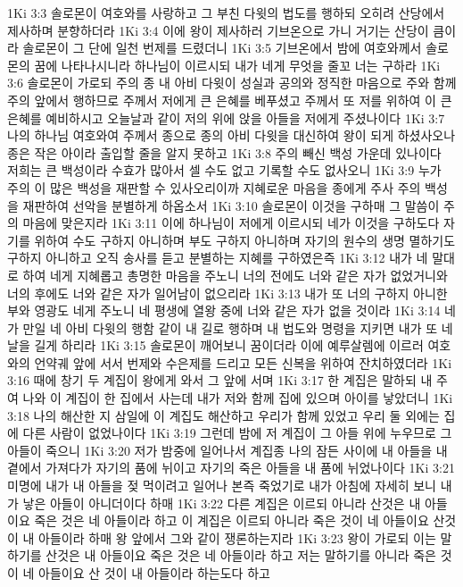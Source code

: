1Ki 3:3  솔로몬이 여호와를 사랑하고 그 부친 다윗의 법도를 행하되 오히려 산당에서 제사하며 분향하더라
1Ki 3:4  이에 왕이 제사하러 기브온으로 가니 거기는 산당이 큼이라 솔로몬이 그 단에 일천 번제를 드렸더니
1Ki 3:5  기브온에서 밤에 여호와께서 솔로몬의 꿈에 나타나시니라 하나님이 이르시되 내가 네게 무엇을 줄꼬 너는 구하라
1Ki 3:6  솔로몬이 가로되 주의 종 내 아비 다윗이 성실과 공의와 정직한 마음으로 주와 함께 주의 앞에서 행하므로 주께서 저에게 큰 은혜를 베푸셨고 주께서 또 저를 위하여 이 큰 은혜를 예비하시고 오늘날과 같이 저의 위에 앉을 아들을 저에게 주셨나이다
1Ki 3:7  나의 하나님 여호와여 주께서 종으로 종의 아비 다윗을 대신하여 왕이 되게 하셨사오나 종은 작은 아이라 출입할 줄을 알지 못하고
1Ki 3:8  주의 빼신 백성 가운데 있나이다 저희는 큰 백성이라 수효가 많아서 셀 수도 없고 기록할 수도 없사오니
1Ki 3:9  누가 주의 이 많은 백성을 재판할 수 있사오리이까 지혜로운 마음을 종에게 주사 주의 백성을 재판하여 선악을 분별하게 하옵소서
1Ki 3:10  솔로몬이 이것을 구하매 그 말씀이 주의 마음에 맞은지라
1Ki 3:11  이에 하나님이 저에게 이르시되 네가 이것을 구하도다 자기를 위하여 수도 구하지 아니하며 부도 구하지 아니하며 자기의 원수의 생명 멸하기도 구하지 아니하고 오직 송사를 듣고 분별하는 지혜를 구하였은즉
1Ki 3:12  내가 네 말대로 하여 네게 지혜롭고 총명한 마음을 주노니 너의 전에도 너와 같은 자가 없었거니와 너의 후에도 너와 같은 자가 일어남이 없으리라
1Ki 3:13  내가 또 너의 구하지 아니한 부와 영광도 네게 주노니 네 평생에 열왕 중에 너와 같은 자가 없을 것이라
1Ki 3:14  네가 만일 네 아비 다윗의 행함 같이 내 길로 행하며 내 법도와 명령을 지키면 내가 또 네 날을 길게 하리라
1Ki 3:15  솔로몬이 깨어보니 꿈이더라 이에 예루살렘에 이르러 여호와의 언약궤 앞에 서서 번제와 수은제를 드리고 모든 신복을 위하여 잔치하였더라
1Ki 3:16  때에 창기 두 계집이 왕에게 와서 그 앞에 서며
1Ki 3:17  한 계집은 말하되 내 주여 나와 이 계집이 한 집에서 사는데 내가 저와 함께 집에 있으며 아이를 낳았더니
1Ki 3:18  나의 해산한 지 삼일에 이 계집도 해산하고 우리가 함께 있었고 우리 둘 외에는 집에 다른 사람이 없었나이다
1Ki 3:19  그런데 밤에 저 계집이 그 아들 위에 누우므로 그 아들이 죽으니
1Ki 3:20  저가 밤중에 일어나서 계집종 나의 잠든 사이에 내 아들을 내 곁에서 가져다가 자기의 품에 뉘이고 자기의 죽은 아들을 내 품에 뉘었나이다
1Ki 3:21  미명에 내가 내 아들을 젖 먹이려고 일어나 본즉 죽었기로 내가 아침에 자세히 보니 내가 낳은 아들이 아니더이다 하매
1Ki 3:22  다른 계집은 이르되 아니라 산것은 내 아들이요 죽은 것은 네 아들이라 하고 이 계집은 이르되 아니라 죽은 것이 네 아들이요 산것이 내 아들이라 하매 왕 앞에서 그와 같이 쟁론하는지라
1Ki 3:23  왕이 가로되 이는 말하기를 산것은 내 아들이요 죽은 것은 네 아들이라 하고 저는 말하기를 아니라 죽은 것이 네 아들이요 산 것이 내 아들이라 하는도다 하고
